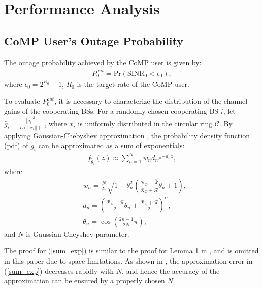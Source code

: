 \documentclass[10pt, doublecolumn]{IEEEtran}
\begin{document}
\section{Performance Analysis}
\subsection{CoMP User's Outage Probability}
The outage probability achieved by the CoMP user is given by:
\begin{align}
  P_{0}^{out}=\text{Pr}\left( \text{SINR}_0 <\epsilon_0\right),
\end{align}
where $\epsilon_0=2^{R_0}-1$, $R_0$ is the target rate of the CoMP user.

To evaluate $P_{0}^{out}$, it is necessary to characterize the distribution of the channel gains of the cooperating BSs. For a randomly chosen cooperating BS $i$, let $\tilde{g_i}=\frac{|g_i|^2}{L(||x_i||)}$ , where $x_i$ is uniformly distributed in the circular ring $\mathcal{C}$. By applying Gaussian-Chebyshev approximation \cite{hildebrand1987introduction}, the {\color{black}probability density function (pdf)} of $\tilde{g}_i$ can be approximated as a sum of exponentials:
\begin{align}\label{sum_exp}
  f_{\tilde{g}_i}(z) \approx  \sum^{N}_{n=1}w_nd_n  e^{-d_nz},
\end{align}
where
\begin{align}
   &w_n=\frac{N}{2\pi}\sqrt{1-\theta_n^2}\left(\frac{\mathcal{R}_{\mathcal{D}}-
   \bar{\mathcal{R}}}{\mathcal{R}_{\mathcal{D}}+\bar{\mathcal{R}}}\theta_n+1\right),\\
   &d_n=\left(\frac{\mathcal{R}_{\mathcal{D}}-\bar{\mathcal{R}}}{2}\theta_n+\frac{\mathcal{R}_{\mathcal{D}}+\bar{\mathcal{R}}}{2}\right)^{\alpha},\\
   &\theta_n=\cos\left(\frac{2n-1}{2N}\pi\right),
\end{align}
and $N$ is Gaussian-Cheyshev parameter.

{\color{black}The proof for (\ref{sum_exp}) is similar to the proof for Lemma 1 in \cite{sys2019PCP}, and is omitted in this paper due to space limitations. As shown in \cite{sys2019PCP}, the approximation error in  (\ref{sum_exp}) decreases rapidly with $N$, and hence the accuracy of the approximation can be ensured by a properly chosen $N$.}
\end{document}
